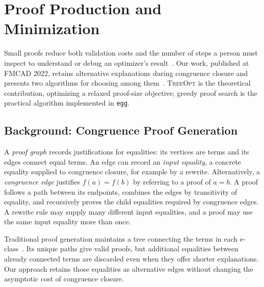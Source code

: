 \section{Proof Production and Minimization}
\label{sec:proofs}

Small proofs reduce both validation costs and the number of steps a person must inspect
  to understand or debug an optimizer's result~\cite{herbie-proofs}.
Our work, published at FMCAD 2022, retains alternative explanations during congruence closure
  and presents two algorithms for choosing among them~\cite{eggproof}.
\textsc{TreeOpt} is the theoretical contribution, optimizing a relaxed proof-size objective;
  greedy proof search is the practical algorithm implemented in \texttt{egg}.

\subsection{Background: Congruence Proof Generation}
\label{sec:background-proof-production}

A \emph{proof graph} records justifications for equalities:
  its vertices are terms and its edges connect equal terms.
An edge can record an \emph{input equality}, a concrete equality supplied to congruence closure,
  for example by a rewrite.
Alternatively, a \emph{congruence edge} justifies $f(a)=f(b)$ by referring to a proof of $a=b$.
A proof follows a path between its endpoints, combines the edges by transitivity of equality,
  and recursively proves the child equalities required by congruence edges.
A rewrite rule may supply many different input equalities,
  and a proof may use the same input equality more than once.

Traditional proof generation maintains a tree connecting the terms in each e-class~\cite{pp-congr}.
Its unique paths give valid proofs, but additional equalities between already connected terms
  are discarded even when they offer shorter explanations.
Our approach retains those equalities as alternative edges
  without changing the asymptotic cost of congruence closure.


